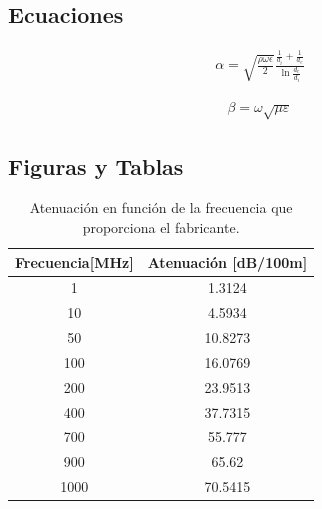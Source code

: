 \documentclass[10pt,conference,a4paper]{IEEEtran}
\begin{document}
\subsection{Ecuaciones}

\begin{eqnarray}
    \label{eq:atenuacion_coaxial}
    \alpha = \sqrt{\frac{\rho \omega \epsilon}{2}} \frac{\frac{1}{d_i} + \frac{1}{d_e}}{\ln{\frac{d_e}{d_i}}}
\end{eqnarray}

\begin{eqnarray}
    \label{eq:constante_fase_coaxial}
    \beta = \omega \sqrt{\mu \varepsilon}
\end{eqnarray}

\subsection{Figuras y Tablas}

\begin{table}[htb]
    \renewcommand{\arraystretch}{1.2}
    \centering
    \begin{tabular}{|c|c|}
	\hline
	Frecuencia[MHz] & Atenuación [dB/100m] \\
	\hline
	1 & 1.3124 \\
	10 & 4.5934 \\
	50 & 10.8273 \\	
	100 & 16.0769 \\
	200 & 23.9513 \\
	400 & 37.7315 \\
	700 & 55.777 \\
	900 & 65.62 \\
	1000 & 70.5415 \\
	\hline
    \end{tabular}
    \caption{Atenuación en función de la frecuencia que proporciona el fabricante.}
    \label{tab:atenuacion_coaxial}
\end{table}
\end{document}
